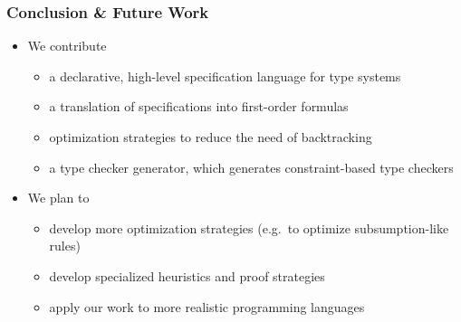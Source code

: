 \documentclass{beamer}
\begin{document}
\begin{frame}
  \frametitle{Conclusion \& Future Work}
  \begin{itemize}
  \item We contribute
    \begin{itemize}
    \item a declarative, high-level specification language for type systems
    \item a translation of specifications into first-order formulas
    \item optimization strategies to reduce the need of backtracking
    \item a type checker generator, which generates constraint-based
      type checkers
    \end{itemize}
  \item We plan to
    \begin{itemize}
    \item develop more optimization strategies (e.g.\ to optimize
      subsumption-like rules)
    \item develop specialized heuristics and proof strategies
    \item apply our work to more realistic programming languages
    \end{itemize}
  \end{itemize}
\end{frame}
\end{document}
